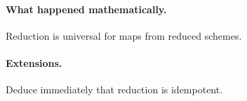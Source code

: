 \paragraph{What happened mathematically.}
Reduction is universal for maps from reduced schemes.

\paragraph{Extensions.}
Deduce immediately that reduction is idempotent.
\fi
